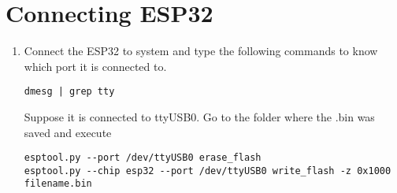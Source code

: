 \documentclass[journal,12pt,twocolumn]{IEEEtran}
\begin{document}
%
%
\section{Connecting ESP32}
\begin{enumerate}


\item Connect the ESP32 to system and type the following commands to know which port it is connected to.
\begin{lstlisting}
dmesg | grep tty
\end{lstlisting}
Suppose it is connected to ttyUSB0. Go to the folder where the .bin was saved and execute 
\begin{lstlisting}
esptool.py --port /dev/ttyUSB0 erase_flash
esptool.py --chip esp32 --port /dev/ttyUSB0 write_flash -z 0x1000 filename.bin
\end{lstlisting}
\end{enumerate}
%
%
%
%
%
%
%
\end{document}
